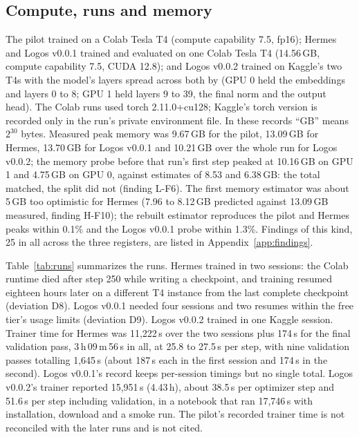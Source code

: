 \subsection{Compute, runs and memory}
The pilot trained on a Colab Tesla T4 (compute capability 7.5, fp16); Hermes and Logos v0.0.1 trained and evaluated on one Colab Tesla T4 (14.56\,GB, compute capability 7.5, CUDA 12.8); and Logos v0.0.2 trained on Kaggle's two T4s with the model's layers spread across both by  (GPU 0 held the embeddings and layers 0 to 8; GPU 1 held layers 9 to 39, the final norm and the output head). The Colab runs used torch 2.11.0+cu128; Kaggle's torch version is recorded only in the run's private environment file. In these records ``GB'' means $2^{30}$ bytes. Measured peak memory was 9.67\,GB for the pilot, 13.09\,GB for Hermes, 13.70\,GB for Logos v0.0.1 and 10.21\,GB over the whole run for Logos v0.0.2; the memory probe before that run's first step peaked at 10.16\,GB on GPU 1 and 4.75\,GB on GPU 0, against estimates of 8.53 and 6.38\,GB: the total matched, the split did not (finding L-F6). The first memory estimator was about 5\,GB too optimistic for Hermes (7.96 to 8.12\,GB predicted against 13.09\,GB measured, finding H-F10); the rebuilt estimator reproduces the pilot and Hermes peaks within 0.1\% and the Logos v0.0.1 probe within 1.3\%. Findings of this kind, 25 in all across the three registers, are listed in Appendix~\ref{app:findings}.

Table~\ref{tab:runs} summarizes the runs. Hermes trained in two sessions: the Colab runtime died after step 250 while writing a checkpoint, and training resumed eighteen hours later on a different T4 instance from the last complete checkpoint (deviation D8). Logos v0.0.1 needed four sessions and two resumes within the free tier's usage limits (deviation D9). Logos v0.0.2 trained in one Kaggle session. Trainer time for Hermes was 11,222\,s over the two sessions plus 174\,s for the final validation pass, 3\,h\,09\,m\,56\,s in all, at 25.8 to 27.5\,s per step, with nine validation passes totalling 1,645\,s (about 187\,s each in the first session and 174\,s in the second). Logos v0.0.1's record keeps per-session timings but no single total. Logos v0.0.2's trainer reported 15,951\,s (4.43\,h), about 38.5\,s per optimizer step and 51.6\,s per step including validation, in a notebook that ran 17,746\,s with installation, download and a smoke run. The pilot's recorded trainer time is not reconciled with the later runs and is not cited.

